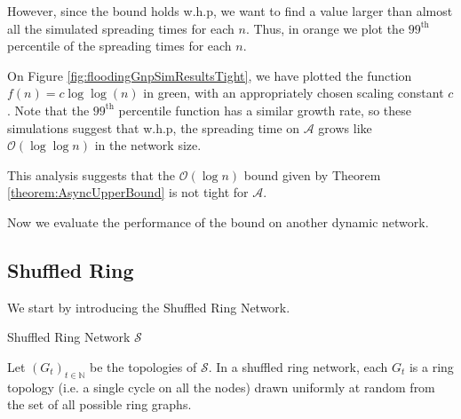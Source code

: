 However, since the bound holds w.h.p, we want to find a value larger than almost all the simulated spreading times for each $n$. Thus, in orange we plot the $99^\text{th}$ percentile of the spreading times for each $n$.

On Figure \ref{fig:floodingGnpSimResultsTight}, we have plotted the function $f(n) = c \log \log (n)$ in green, with an appropriately chosen scaling constant $c$. Note that the $99^\text{th}$ percentile function has a similar growth rate, so these simulations suggest that w.h.p, the spreading time on $\mathcal{A}$ grows like $\mathcal{O}(\log \log n)$ in the network size.

This analysis suggests that the $\mathcal{O}(\log n)$ bound given by Theorem \ref{theorem:AsyncUpperBound} is not tight for $\mathcal{A}$.

Now we evaluate the performance of the bound on another dynamic network.

\subsection{Shuffled Ring}\label{section:shuffledRingAsyncApplication}

We start by introducing the Shuffled Ring Network.

\begin{definition}
	Shuffled Ring Network $\mathcal{S}$

	Let $(G_t)_{t \in \mathbb{N}}$ be the topologies of $\mathcal{S}$. In a shuffled ring network, each $G_t$ is a ring topology (i.e. a single cycle on all the nodes) drawn uniformly at random from the set of all possible ring graphs. 
\end{definition}


